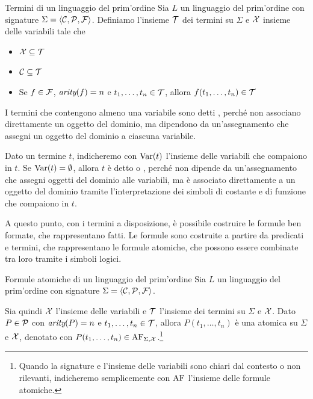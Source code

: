 \begin{definition}{Termini di un linguaggio del prim'ordine}
  Sia \(L\) un linguaggio del prim'ordine con signature \(\Sigma = \langle \mathcal{C}, \mathcal{P}, \mathcal{F} \rangle\). Definiamo l'insieme \(\mathcal{T}\) dei termini su \(\Sigma\) e \(\mathcal{X}\) insieme delle variabili tale che
  \begin{itemize}
    \item \(\mathcal{X}\subseteq \mathcal{T}\)
    \item \(\mathcal{C}\subseteq \mathcal{T}\)
    \item Se \(f\in\mathcal{F}\), \(\operatorname{\textit{arity}}(f)=n\) e \(t_1,\dots,t_n\in \mathcal{T}\), allora \(f(t_1,\dots,t_n)\in \mathcal{T}\)
  \end{itemize}

  I termini che contengono almeno una variabile sono detti , perché non associano direttamente un oggetto del dominio, ma dipendono da un'assegnamento che assegni un oggetto del dominio a ciascuna variabile. 

  Dato un termine \(t\), indicheremo con \(\operatorname{Var}(t)\) l'insieme delle variabili che compaiono in \(t\). Se \(\operatorname{Var}(t)=\emptyset\), allora \(t\) è detto  o , perché non dipende da un'assegnamento che assegni oggetti del dominio alle variabili, ma è associato direttamente a un oggetto del dominio tramite l'interpretazione dei simboli di costante e di funzione che compaiono in \(t\).
\end{definition}

A questo punto, con i termini a disposizione, è possibile costruire le formule ben formate, che rappresentano fatti. Le formule sono costruite a partire da predicati e termini, che rappresentano le formule atomiche, che possono essere combinate tra loro tramite i simboli logici.

\begin{definition}{Formule atomiche di un linguaggio del prim'ordine}
  Sia \(L\) un linguaggio del prim'ordine con signature \(\Sigma = \langle \mathcal{C}, \mathcal{P}, \mathcal{F} \rangle\).
  
  Sia quindi \(\mathcal{X}\) l'insieme delle variabili e \(\mathcal{T}\) l'insieme dei termini su \(\Sigma\) e \(\mathcal{X}\). Dato \(P\in\mathcal{P}\) con \(\operatorname{\textit{arity}}(P)=n\) e \(t_1,\dots,t_n\in \mathcal{T}\), allora \(P(t_1,\dots,t_n)\) è una  atomica su \(\Sigma\) e \(\mathcal{X}\), denotato con \(P(t_1,\dots,t_n)\in \AF[\Sigma,\VarSyms]\).\footnote{Quando la signature e l'insieme delle variabili sono chiari dal contesto o non rilevanti, indicheremo semplicemente con \(\AF\) l'insieme delle formule atomiche.}

\end{definition}

